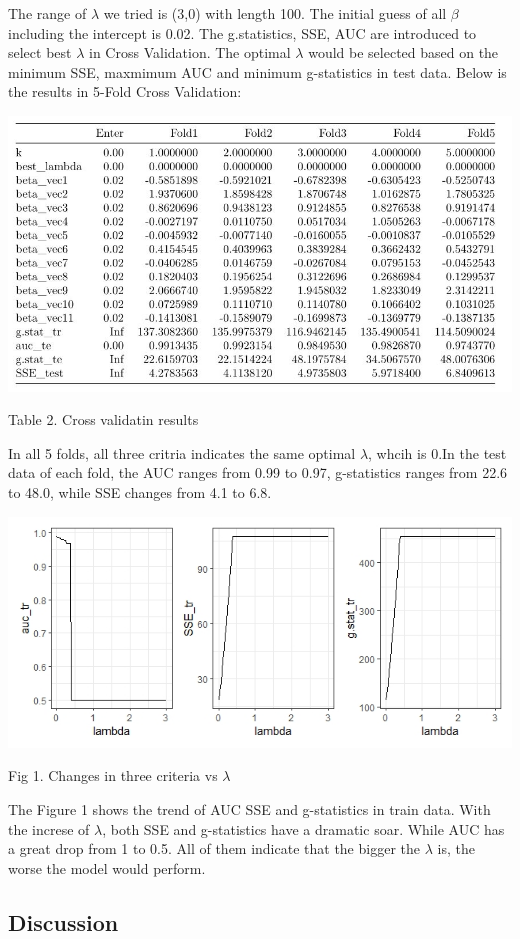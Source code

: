 \documentclass[]{article}
\begin{document}
The range of \(\lambda\) we tried is (3,0) with length 100. The initial
guess of all \(\beta\) including the intercept is 0.02. The
g.statistics, SSE, AUC are introduced to select best \(\lambda\) in
Cross Validation. The optimal \(\lambda\) would be selected based on the
minimum SSE, maxmimum AUC and minimum g-statistics in test data. Below
is the results in 5-Fold Cross Validation:

\begin{center}
\includegraphics{./results/Results from Yuqi.JPG}
\end{center}

\begin{center}
Table 2. Cross validatin results
\end{center}

In all 5 folds, all three critria indicates the same optimal
\(\lambda\), whcih is 0.In the test data of each fold, the AUC ranges
from 0.99 to 0.97, g-statistics ranges from 22.6 to 48.0, while SSE
changes from 4.1 to 6.8.

\begin{center}
\includegraphics{./results/lambda_change.jpeg}
\end{center}

\begin{center}
Fig 1. Changes in three criteria vs $\lambda$
\end{center}

The Figure 1 shows the trend of AUC SSE and g-statistics in train data.
With the increse of \(\lambda\), both SSE and g-statistics have a
dramatic soar. While AUC has a great drop from 1 to 0.5. All of them
indicate that the bigger the \(\lambda\) is, the worse the model would
perform.

\hypertarget{discussion}{%
\subsection{Discussion}\label{discussion}}
\end{document}
